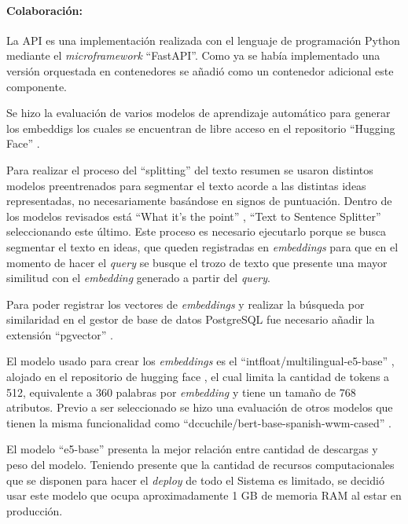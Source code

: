 \documentclass[
  12pt,
  openany]{book}
\begin{document}
\hypertarget{semancola}{%
\paragraph{Colaboración:}\label{semancola}}

La API es una implementación realizada con el lenguaje de programación Python mediante el \emph{microframework} ``FastAPI''. Como ya se había implementado una versión orquestada en contenedores se añadió como un contenedor adicional este componente.

Se hizo la evaluación de varios modelos de aprendizaje automático para generar los embeddigs los cuales se encuentran de libre acceso en el repositorio ``Hugging Face'' \citep{hfmodels2023}.

Para realizar el proceso del ``splitting'' del texto resumen se usaron distintos modelos preentrenados para segmentar el texto acorde a las distintas ideas representadas, no necesariamente basándose en signos de puntuación. Dentro de los modelos revisados está ``What it's the point'' \citep{minixhofer-etal-2023-wheres} , ``Text to Sentence Splitter'' \citep{sensplit22023} seleccionando este último. Este proceso es necesario ejecutarlo porque se busca segmentar el texto en ideas, que queden registradas en \emph{embeddings} para que en el momento de hacer el \emph{query} se busque el trozo de texto que presente una mayor similitud con el \emph{embedding} generado a partir del \emph{query}.

Para poder registrar los vectores de \emph{embeddings} y realizar la búsqueda por similaridad en el gestor de base de datos PostgreSQL fue necesario añadir la extensión ``pgvector'' \citep{pgvector2023}.

El modelo usado para crear los \emph{embeddings} es el ``intfloat/multilingual-e5-base'' \citep{wang2022}, alojado en el repositorio de hugging face \citep{e5base}, el cual limita la cantidad de tokens a 512, equivalente a 360 palabras por \emph{embedding} y tiene un tamaño de 768 atributos. Previo a ser seleccionado se hizo una evaluación de otros modelos que tienen la misma funcionalidad como ``dccuchile/bert-base-spanish-wwm-cased'' \citep{canete2020}.

El modelo ``e5-base'' presenta la mejor relación entre cantidad de descargas y peso del modelo. Teniendo presente que la cantidad de recursos computacionales que se disponen para hacer el \emph{deploy} de todo el Sistema es limitado, se decidió usar este modelo que ocupa aproximadamente 1 GB de memoria RAM al estar en producción.
\end{document}
